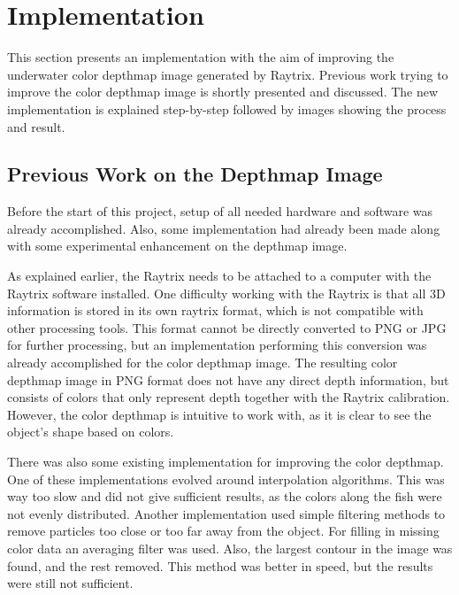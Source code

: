 \section{Implementation}\label{implementation}

This section presents an implementation with the aim of improving the underwater color depthmap image generated by Raytrix. Previous work trying to improve the color depthmap image is shortly presented and discussed. The new implementation is explained step-by-step followed by images showing the process and result.


\subsection{Previous Work on the Depthmap Image}

Before the start of this project, setup of all needed hardware and software was already accomplished. Also, some implementation had already been made along with some experimental enhancement on the depthmap image.

As explained earlier, the Raytrix needs to be attached to a computer with the Raytrix software installed. One difficulty working with the Raytrix is that all 3D information is stored in its own raytrix format, which is not compatible with other processing tools. This format cannot be directly converted to PNG or JPG for further processing, but an implementation performing this conversion was already accomplished for the color depthmap image. The resulting color depthmap image in PNG format does not have any direct depth information, but consists of colors that only represent depth together with the Raytrix calibration.
However, the color depthmap is intuitive to work with, as it is clear to see the object's shape based on colors.

There was also some existing implementation for improving the color depthmap. One of these implementations evolved around interpolation algorithms. This was way too slow and did not give sufficient results, as the colors along the fish were not evenly distributed.  
Another implementation used simple filtering methods to remove particles too close or too far away from the object. For filling in missing color data an averaging filter was used. Also, the largest contour in the image was found, and the rest removed. This method was better in speed, but the results were still not sufficient. 


